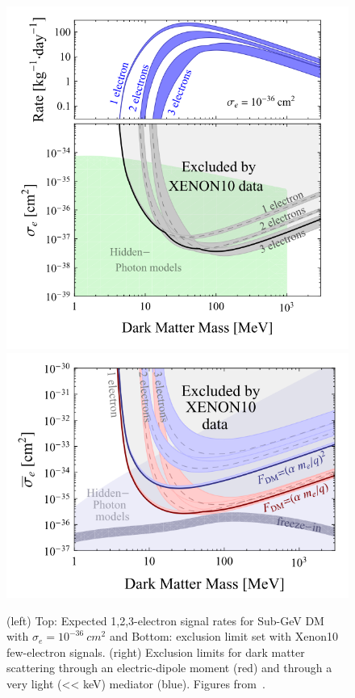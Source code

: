 \begin{figure}[htbp]
\begin{center}
\includegraphics[width=\halffig]{figures/lxetpcs/subGeV.png}
\includegraphics[width=\halffig]{figures/lxetpcs/subGeV2.png}
\caption{(left) Top: Expected 1,2,3-electron signal rates for Sub-GeV DM with $\sigma_{e} = 10^{-36}~cm^{2}$ and Bottom: exclusion limit set with Xenon10 few-electron signals. (right) Exclusion limits for dark matter scattering through an electric-dipole moment (red) and through a very light (<< keV) mediator (blue). Figures from~\cite{Essig2012}. }
\label{fig:subGeV}
\end{center}
\end{figure}


